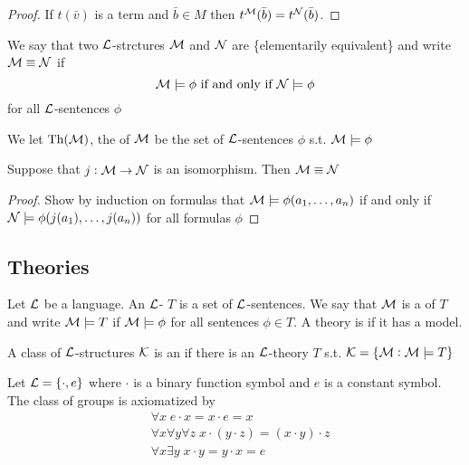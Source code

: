 \documentclass[11pt]{article}
\begin{document}
\begin{proof}
 If \(t(\bar{v})\) is a term and \(\bar{b}\in M\) then
\(t^{\mathcal{M}}(\bar{b})=t^{\mathcal{N}}(\bar{b})\). 
\end{proof}

\begin{definition}[]
We say that two \(\mathcal{L}\)-strctures \(\mathcal{M}\) and \(\mathcal{N}\) are \tf\{elementarily
equivalent\} and write \(\mathcal{M}\equiv\mathcal{N}\) if
\begin{equation*}
 \mathcal{M}\models\phi\text{ if and only if } \mathcal{N}\models\phi
\end{equation*}
for all \(\mathcal{L}\)-sentences \(\phi\)
\end{definition}

We let \(\text{Th}(\mathcal{M})\), the  of \(\mathcal{M}\) be the set of
\(\mathcal{L}\)-sentences \(\phi\) s.t. \(\mathcal{M}\models\phi\)

\begin{theorem}[]
Suppose that \(j:\mathcal{M}\to\mathcal{N}\) is an isomorphism. Then \(\mathcal{M}\equiv\mathcal{N}\)
\end{theorem}

\begin{proof}
Show by induction on formulas that \(\mathcal{M}\models\phi(a_1,\dots,a_n)\) if and
only if \(\mathcal{N}\models\phi(j(a_1),\dots,j(a_n))\) for all formulas \(\phi\)
\end{proof}
\subsection{Theories}
\label{sec:org6662927}
Let \(\mathcal{L}\) be a language. An \(\mathcal{L}\)- \(T\) is a set of
\(\mathcal{L}\)-sentences. We say that \(\mathcal{M}\) is a  of \(T\) and write
\(\mathcal{M}\models T\) if \(\mathcal{M}\models\phi\) for all sentences \(\phi\in T\). A
theory is  if it has a model.

A class of \(\mathcal{L}\)-structures \(\mathcal{K}\) is an  if there
is an \(\mathcal{L}\)-theory \(T\) s.t. \(\mathcal{K}=\{\mathcal{M}:\mathcal{M}\models T\}\)

\begin{example}[Groups]
Let $\mathcal{L}=\{\cdot,e\}$ where $\cdot$ is a binary function symbol and $e$ is a 
constant symbol. The class of groups is axiomatized by
\begin{align*}
&\forall x\;e\cdot x=x\cdot e=x\\
&\forall x\forall y\forall z\;x\cdot(y\cdot z)=(x\cdot y)\cdot z\\
&\forall x\exists y\;x\cdot y=y\cdot x= e
\end{align*}
\end{example}
\end{document}
